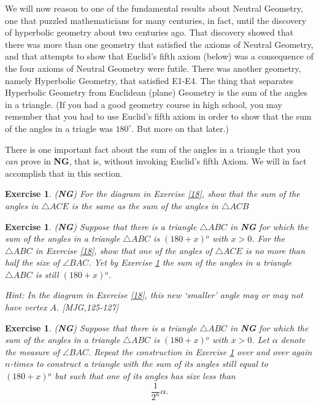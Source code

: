 \documentclass{article}%
\providecommand{\U}[1]{\protect\rule{.1in}{.1in}}
\newtheorem{exercise}[theorem]{Exercise}
\begin{document}
We will now reason to one of the fundamental results about Neutral Geometry,
one that puzzled mathematicians for many centuries, in fact, until the
discovery of hyperbolic geometry about two centuries ago. That discovery
showed that there was more than one geometry that satisfied the axioms of
Neutral Geometry, and that attempts to show that Euclid's fifth axiom (below)
was a consequence of the four axioms of Neutral Geometry were futile. There
was another geometry, namely Hyperbolic Geometry, that satisfied E1-E4. The
thing that separates Hyperbolic Geometry from Euclidean (plane) Geometry is
the sum of the angles in a triangle. (If you had a good geometry course in
high school, you may remember that you had to use Euclid's fifth axiom in
order to show that the sum of the angles in a triagle was $180^{\circ}.$ But
more on that later.)

There is one important fact about the sum of the angles in a triangle that you
\textit{can} prove in \textbf{NG}, that is, without invoking Euclid's fifth
Axiom. We will in fact accomplish that in this section.

\begin{exercise}
\label{20}(\textbf{NG}) For the diagram in Exercise \ref{18}, show that the
sum of the angles in $\triangle ACE$ is the same as the sum of the angles in
$\triangle ACB$
\end{exercise}

\begin{exercise}
\label{22}(\textbf{NG}) Suppose that there is a triangle $\triangle ABC$ in
\textbf{NG} for which the sum of the angles in a triangle $\triangle ABC$ is
$\left(  180+x\right)
{{}^o}%
$ with $x>0$. For the $\triangle ABC$ in Exercise \ref{18}, show that one of
the angles of $\triangle ACE$ is no more than half the size of $\angle BAC$.
Yet by Exercise \ref{20} the sum of the angles in a triangle $\triangle ABC$
is still $\left(  180+x\right)
{{}^o}%
$.

Hint: In the diagram in Exercise \ref{18}, this new `smaller' angle may or may
not have vertex $A$. [MJG,125-127]
\end{exercise}

\begin{exercise}
\label{21}(\textbf{NG}) Suppose that there is a triangle $\triangle ABC$ in
\textbf{NG} for which the sum of the angles in a triangle $\triangle ABC$ is
$\left(  180+x\right)
{{}^o}%
$ with $x>0$. Let $\alpha$ denote the measure of $\angle BAC$. Repeat the
construction in Exercise \ref{22} over and over again $n$-times to construct a
triangle with the sum of its angles still equal to $\left(  180+x\right)
{{}^o}%
$ but such that one of its angles has size less than%
\[
\frac{1}{2^{n}}\alpha.
\]

\end{exercise}
\end{document}
